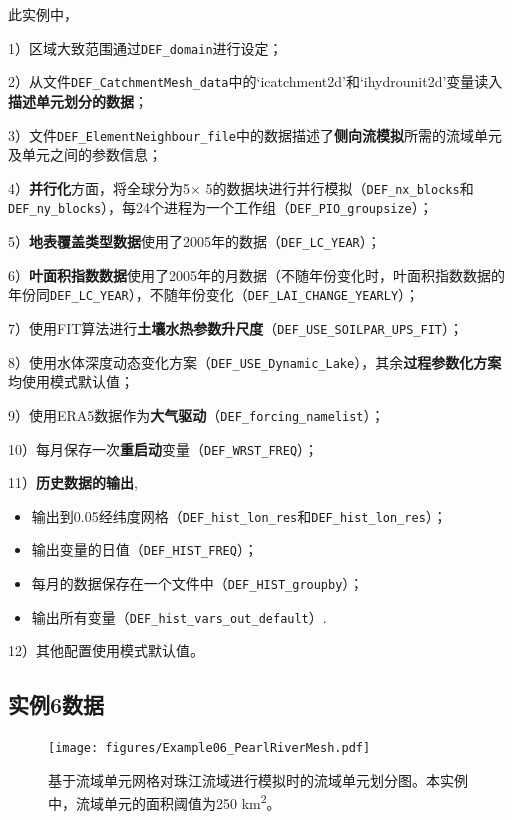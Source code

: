 此实例中，\par
1）区域大致范围通过\texttt{DEF\_domain}进行设定；\par
2）从文件\texttt{DEF\_CatchmentMesh\_data}中的`icatchment2d'和`ihydrounit2d'变量读入\textbf{描述单元划分的数据}；\par
3）文件\texttt{DEF\_ElementNeighbour\_file}中的数据描述了\textbf{侧向流模拟}所需的流域单元及单元之间的参数信息；\par
4）\textbf{并行化}方面，将全球分为5\textdegree$\times$ 5\textdegree 的数据块进行并行模拟（\texttt{DEF\_nx\_blocks}和\texttt{DEF\_ny\_blocks}），每24个进程为一个工作组（\texttt{DEF\_PIO\_groupsize}）；\par
5）\textbf{地表覆盖类型数据}使用了2005年的数据（\texttt{DEF\_LC\_YEAR}）；\par
6）\textbf{叶面积指数数据}使用了2005年的月数据（不随年份变化时，叶面积指数数据的年份同\texttt{DEF\_LC\_YEAR}），不随年份变化（\texttt{DEF\_LAI\_CHANGE\_YEARLY}）；\par
7）使用FIT算法进行\textbf{土壤水热参数升尺度}（\texttt{DEF\_USE\_SOILPAR\_UPS\_FIT}）；\par
8）使用水体深度动态变化方案（\texttt{DEF\_USE\_Dynamic\_Lake}），其余\textbf{过程参数化方案}均使用模式默认值；\par
9）使用ERA5数据作为\textbf{大气驱动}（\texttt{DEF\_forcing\_namelist}）；\par
10）每月保存一次\textbf{重启动}变量（\texttt{DEF\_WRST\_FREQ}）；\par
11）\textbf{历史数据的输出},
\begin{itemize}[nosep,leftmargin=4em]
    \item 输出到0.05\textdegree 经纬度网格（\texttt{DEF\_hist\_lon\_res}和\texttt{DEF\_hist\_lon\_res}）；
    \item 输出变量的日值（\texttt{DEF\_HIST\_FREQ}）；
    \item 每月的数据保存在一个文件中（\texttt{DEF\_HIST\_groupby}）；
    \item 输出所有变量（\texttt{DEF\_hist\_vars\_out\_default}）.
\end{itemize}\par
12）其他配置使用模式默认值。

\subsection{实例6数据}

\begin{figure}[htpb]
    \centering
    \texttt{[image: figures/Example06\_PearlRiverMesh.pdf]}
    \caption{基于流域单元网格对珠江流域进行模拟时的流域单元划分图。本实例中，流域单元的面积阈值为250 \unit{km^2}。}
    \label{fig:fig_pearlriver}
\end{figure}

